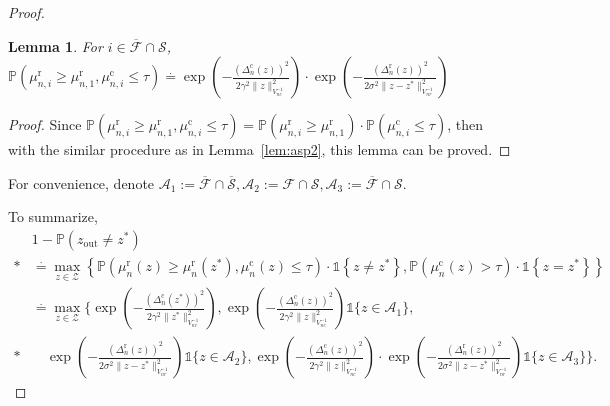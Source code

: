 \documentclass[accepted]{uai2025} %
\theoremstyle{plain}
\newtheorem{lemma}[theorem]{Lemma}
\theoremstyle{definition}
\theoremstyle{remark}
\newcommand{\Deltac}{\Delta^{\mathrm{c}}}
\newcommand{\Deltar}{\Delta^{\mathrm{r}}}
\newcommand{\muc}{\mu^{\mathrm{c}}}
\newcommand{\mur}{\mu^{\mathrm{r}}}
\newcommand{\PP}{\mathbb{P}} %
\newcommand{\cbr}[1]{\left\{#1\right\}}
\newcommand*{\one}{\mathds{1}}
\def\cd{\cdot}
\begin{document}
\begin{proof}
\begin{lemma}
\label{lem:asp4}
    For $i\in \overline{\mathcal{F}}\cap {\mathcal{S}}$,
    $\PP(\mur_{n,i}\ge \mur_{n,1}, \muc_{n,i}\le \tau)\stackrel{\cdot}{=}\exp\left(-\frac{(\Deltac_n(z))^2}{2\gamma^2 \lVert z \rVert^2_{V^{-1}_{nc}}}\right)\cd\exp\left(-\frac{(\Deltar_n(z))^2}{2\sigma^2 \lVert z-z^* \rVert^2_{V^{-1}_{nr}}}\right)$
\end{lemma}
\begin{proof}
    Since $\PP(\mur_{n,i}\ge \mur_{n,1}, \muc_{n,i}\le \tau)= \PP(\mur_{n,i}\ge \mur_{n,1}) \cd \PP(\muc_{n,i}\le \tau)$, then with the similar procedure as in Lemma~\ref{lem:asp2}, this lemma can be proved.
\end{proof}











For convenience, denote $\mathcal{A}_1:= \overline{\mathcal{F}}\cap \overline{\mathcal{S}}, \mathcal{A}_2:= {\mathcal{F}}\cap {\mathcal{S}}, \mathcal{A}_3:= \overline{\mathcal{F}}\cap {\mathcal{S}} $. 

To summarize,
\begin{align*}
    &1-\PP(z_{\text{out}}\neq z^*) \\*
    & \stackrel{\cdot}{=}\max_{z\in \mathcal{Z}} \cbr{\PP(\mur_{n}(z)\ge \mur_{n}(z^*), \muc_{n}(z)\le \tau)\cd \one \cbr{z\neq z^*}, \PP (\muc_{n}(z)>\tau) \cd \one \cbr{z=z^*}}\\
    & \stackrel{\cdot}{=} \max_{z\in \mathcal{Z}}  \bigg\{
        \exp\left(-\frac{(\Deltac_n(z^*))^2}{2\gamma^2 \lVert z^*\rVert^2_{V^{-1}_{nc}}}\right), \exp\left(-\frac{(\Deltac_n(z))^2}{2\gamma^2 \lVert z \rVert^2_{V^{-1}_{nc}}}\right) \one\{z \in \mathcal{A}_1\}, \\*
        & \quad \exp\left(-\frac{(\Deltar_n(z))^2}{2\sigma^2 \lVert z - z^* \rVert^2_{V^{-1}_{nr}}}\right) \one\{z \in \mathcal{A}_2\},  \exp\left(-\frac{(\Deltac_n(z))^2}{2\gamma^2 \lVert z \rVert^2_{V^{-1}_{nc}}}\right) \cdot 
        \exp\left(-\frac{(\Deltar_n(z))^2}{2\sigma^2 \lVert z - z^* \rVert^2_{V^{-1}_{nr}}}\right) \one\{z \in \mathcal{A}_3\} 
        \bigg\}.
\end{align*}


\end{proof}
\end{document}

